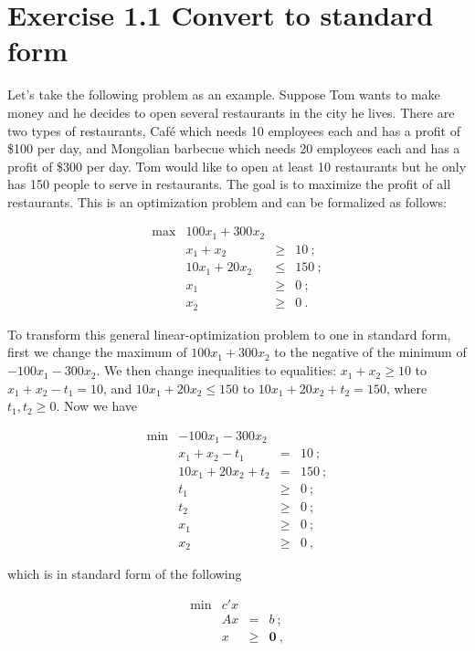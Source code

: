 \section{Exercise 1.1 Convert to standard form}

Let's take the following problem as an example. Suppose Tom wants to make money and he decides to open several restaurants in the city he lives. There are two types of restaurants, Caf\'{e} which needs 10 employees each and has a profit of \$100 per day, and Mongolian barbecue which needs 20 employees each and has a profit of \$300 per day. Tom would like to open at least 10 restaurants but he only has 150 people to serve in restaurants. The goal is to maximize the profit of all restaurants. This is an optimization problem and can be formalized as follows:

\[
\begin{array}{rrcl}
 \max & 100x_1 + 300x_2  &      &   \\
      &  x_1 + x_2  &   \geq  & 10~; \\
      &  10x_1 + 20x_2 & \leq & 150~; \\
      &   x_1  & \geq & 0 ~; \\
      &   x_2  & \geq & 0~.
\end{array}
\]

To transform this general linear-optimization problem to one in standard form, first we change the maximum of $100x_1 + 300x_2$ to the negative of the minimum of $-100x_1 - 300x_2$. We then change inequalities to equalities: $ x_1 + x_2 \geq 10$ to $ x_1 + x_2 - t_1 = 10$, and $10x_1 + 20x_2 \leq 150$ to $10x_1 + 20x_2 + t_2  = 150 $, where $t_1,t_2\geq 0$. Now we have

\[
\begin{array}{rrcl}
 \min & -100x_1 - 300x_2  &      &   \\
      &  x_1 + x_2 - t_1  &   =  & 10~; \\
      &  10x_1 + 20x_2 + t_2 & = & 150~; \\
      &   t_1  & \geq & 0~; \\
      &   t_2  & \geq & 0~; \\
      &   x_1  & \geq & 0 ~; \\
      &   x_2  & \geq & 0~,
\end{array}
\]

which is in standard form of the following

\[
\tag{P}
\begin{array}{rrcl}
 \min & c'x  &      &   \\
      &  Ax  &   =  & b~; \\
      &   x  & \geq & \mathbf{0}~,
\end{array}
\]

